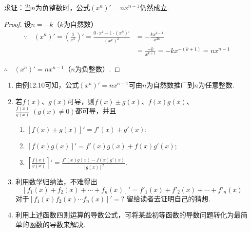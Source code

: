 \begin{example}
    求证：当$n$为负整数时，公式$(x^n)'=nx^{n-1}$仍然成立.
\end{example}

\begin{proof}
设$n=-k$（$k$为自然数）
\[\begin{split}
 \because\quad (x^n)'=\left(\frac{1}{x^k}\right)'=\frac{0\cdot x^k-1\cdot (x^k)'}{(x^k)^2}&=-\frac{kx^{k-1}}{x^{2k}}\\
 &=\frac{-k}{x^{k+1}}=-kx^{-(k+1)}=nx^{n-1}   
\end{split}\]

$\therefore\quad (x^n)'=nx^{n-1}$（$n$为负整数）.
\end{proof}


\begin{rmk}
\begin{enumerate}
    \item 由例12.10可知，公式$(x^n)'=nx^{n-1}$可由$n$为自然数推广到$n$为任意整数.
    \item 若$f(x)$、$g(x)$可导，则$f(x)\pm g(x)$、$f(x)g(x)$、$\frac{f(x)}{g(x)}\; (g(x)\ne 0)$都可导，并且
\begin{enumerate}[(1)]
\item $[f(x)\pm g(x)]'=f'(x)\pm g'(x)$;
\item $[f(x)g(x)]'=f'(x)g(x)+f(x)g'(x)$;
\item $\left[\frac{f(x)}{g(x)}\right]'=\frac{f'(x)g(x)-f(x)g'(x)}{[g(x)]^2}$.
\end{enumerate}

    \item 利用数学归纳法，不难得出
\[ [f_1(x)+f_2(x)+\cdots +f_n(x)]'=f'_1(x)+f'_2(x)+\cdots +f'_n(x)\]
    对于$[f_1(x)f_2(x)\cdots f_n(x)]'=?$ 留给读者去证明自己的猜想.
    \item 利用上述函数四则运算的导数公式，可将某些初等函数的导数问题转化为最简单的函数的导数来解决.
\end{enumerate}
\end{rmk}


